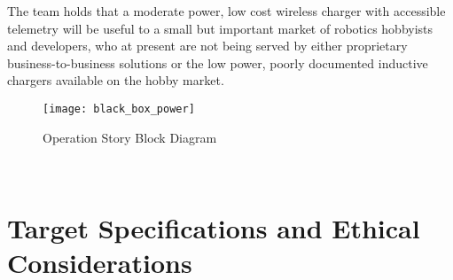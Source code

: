 \documentclass[12pt]{article}
\begin{document}
The team holds that a moderate power, low cost wireless charger with accessible telemetry will be useful to a small but important market of robotics hobbyists and developers, who at present are not being served by either proprietary business-to-business solutions or the low power, poorly documented inductive chargers available on the hobby market.\\
\hfill 
\begin{figure}[h!]
\centering
\texttt{[image: black\_box\_power]}
\caption{Operation Story Block Diagram}
\end{figure}
\hfill \\
\pagebreak
\section{Target Specifications and Ethical Considerations}
\end{document}
